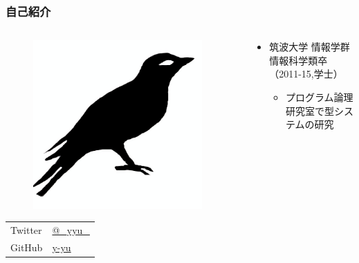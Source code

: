 \begin{frame}
  \frametitle{自己紹介}
  
  \begin{columns}
    \begin{column}{0.3\textwidth}
      \begin{center}
        \begin{figure}
          \includegraphics[width=0.95\textwidth]{img/bird2x.png}
        \end{figure}
      \end{center}
 
      \begin{table}[h]
        \begin{tabular}{ll}
          Twitter & \href{https://twitter.com/\_yyu\_}{@\_yyu\_} \\
          GitHub &  \href{https://github.com/y-yu}{y-yu} \\
        \end{tabular}
      \end{table}
    \end{column}
    \begin{column}{0.7\textwidth}
      \begin{itemize}
        \item 筑波大学 情報学群 情報科学類卒（2011-15,学士）
        \begin{itemize}
          \item プログラム論理研究室で型システムの研究
        \end{itemize}


\end{itemize}
\end{column}
\end{columns}
\end{frame}

